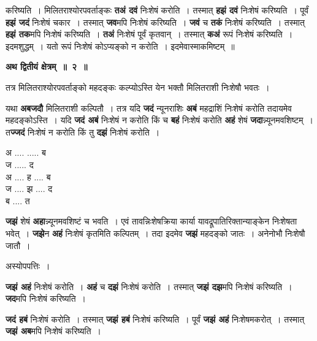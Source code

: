 \documentclass[11pt, openany]{book}
\begin{document}
\noindent करिष्यति~। 
मिलितराश्योरपवर्ताङ्कः \textbf{तअं दवं} निःशेषं करोति~। तस्मात् \textbf{हझं दवं} निःशेषं करिष्यति~। पूर्वं \textbf{हझं जदं} निःशेषं चकार~। तस्मात् \textbf{जव}मपि निःशेषं करिष्यति~। \textbf{जवं} च \textbf{तकं} निःशेषं करिष्यति~। तस्मात् \textbf{हझं तक}मपि निःशेषं करिष्यति~। \textbf{तअं} निःशेषं पूर्वं कृतवान्~। तस्मात् \textbf{कअं} रूपं निःशेषं करिष्यति~। इदमशुद्धम्~। यतो रूपं निःशेषं कोऽप्यङ्को न करोति~। इदमेवास्माकमिष्टम्~॥ 
\vspace{2mm}

\begin{center}
 \textbf{\large अथ द्वितीयं क्षेत्रम्~॥~२~॥}
\end{center}

 {\ab तत्र मिलितराश्योरपवर्ताङ्को महदङ्कः कल्प्योऽस्ति येन  भक्तौ मिलितराशी निःशेषौ भवतः~।} 

\begin{flushleft}
\begin{minipage}[t]{0.6\textwidth}
यथा \textbf{अबजदौ} मिलितराशी कल्पितौ~। तत्र यदि \textbf{जदं} न्यूनराशिः 
\textbf{अबं} महद्राशिं निःशेषं करोति तदायमेव  महदङ्कोऽस्ति~। यदि \textbf{जदं अबं}  निःशेषं न
करोति किं च \textbf{बहं} निःशेषं   करोति \textbf{अहं}
शेषं \textbf{जदा}न्न्यूनमवशिष्टम्~। त\textbf{ज्जदं} निःशेषं  न करोति किं तु \textbf{दझं} निःशेषं करोति~।
\end{minipage} 
\hfill
\begin{minipage}[t]{0.3\textwidth}
अ .... ..... ब\\
ज ..... द\\
अ .... ह .... ब\\
ज .... झ .... द\\ 
ब .... त
\end{minipage}
\end{flushleft}
\vspace{-3mm}

\noindent \textbf{जझं} शेषं \textbf{अहा}न्न्यूनमवशिष्टं च भवति~। एवं तावन्निःशेषक्रिया कार्या यावद्रूपातिरिक्तान्याङ्केन निःशेषता भवेत्~। \textbf{जझे}न \textbf{अहं} निःशेषं कृतमिति कल्पितम्~। तदा इदमेव \textbf{जझं} महदङ्को जातः~। अनेनोभौ  निःशेषौ जातौ~। 

\begin{center}
अस्योपपत्तिः~।
\end{center}

\textbf{जझं अहं} निःशेषं करोति~। \textbf{अहं} च \textbf{दझं} निःशेषं करोति~। तस्मात् \textbf{जझं दझ}मपि निःशेषं करिष्यति~। \textbf{जद}मपि निःशेषं करिष्यति~। 

\newpage
\noindent \textbf{जदं हबं} निःशेषं करोति~। तस्मात् \textbf{जझं हबं} निःशेषं करिष्यति~। पूर्वं \textbf{जझं अहं} निःशेषमकरोत्~। तस्मात् \textbf{जझं अब}मपि निःशेषं करिष्यति~।  \\
\vspace{-2mm}
\end{document}
